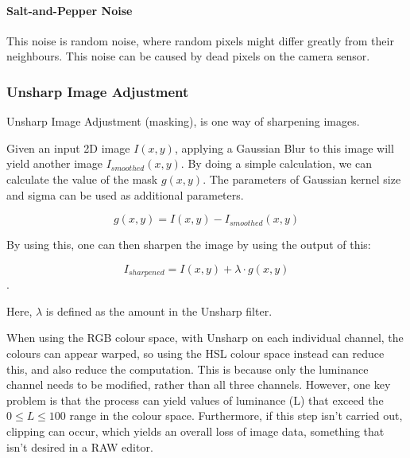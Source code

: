 \documentclass[10pt,a4paper]{article}
\begin{document}
\paragraph{Salt-and-Pepper Noise}
    This noise is random noise, where random pixels might differ greatly from their neighbours. This noise can be caused
    by dead pixels on the camera sensor. \cite{NRandFiltering}
    



\subsubsection{Unsharp Image Adjustment}
    Unsharp Image Adjustment (masking), is one way of sharpening images.

    Given an input 2D image $I(x, y)$, applying a Gaussian Blur to this image will yield another image $I_{smoothed}(x, y)$.
    By doing a simple calculation, we can calculate the value of the mask $g(x, y)$. The parameters of Gaussian kernel size and 
    sigma can be used as additional parameters.

    $$g(x, y) = I(x, y) -  I_{smoothed}(x, y)$$

    By using this, one can then sharpen the image by using the output of this:

    $$I_{sharpened} = I(x, y) + \lambda \cdot g(x, y)$$.

    Here, $\lambda$ is defined as the amount in the Unsharp filter.
    
    \cite{Unsharp}

    When using the RGB colour space, with Unsharp on each individual channel, the colours can appear warped, so using the HSL colour space instead
    can reduce this, and also reduce the computation. This is because only the luminance channel needs to be modified, rather than all three channels.
    However, one key problem is that the process can yield values of luminance (L) that exceed the $0 \le L \le 100$ range in the colour space.
    Furthermore, if this step isn't carried out, clipping can occur, which yields an overall loss of image data, something that isn't desired in a RAW editor.
    
\end{document}
